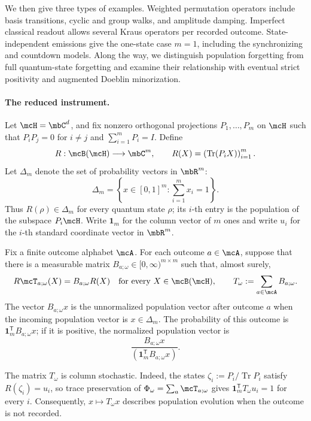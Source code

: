 \documentclass[a4paper]{article}
\numberwithin{equation}{section}   %
\theoremstyle{plain}   %
\theoremstyle{plain}   %
\theoremstyle{examplestyle}
\begin{document}
    We then give three types of examples. Weighted permutation operators include basis transitions, cyclic and group walks, and amplitude damping.
    Imperfect classical readout allows several Kraus operators per recorded outcome. 
    State-independent emissions give the one-state case $m=1$, including the synchronizing and countdown models.
    Along the way, we distinguish population forgetting from full quantum-state forgetting and examine their relationship with eventual strict positivity and augmented Doeblin minorization.

    \paragraph{The reduced instrument.}
        Let $\mcH=\mbC^d$, and fix nonzero orthogonal projections  $P_1,\ldots,P_m$ on $\mcH$ such that $P_iP_j=0$ for $i\ne j$ and $\sum_{i=1}^mP_i=I$.
        Define
        \[
         R:\mcB(\mcH)\longrightarrow\mbC^m,
         \qquad R(X)=\left(\operatorname{Tr}(P_iX)\right)_{i=1}^m.
        \]
        Let $\Delta_m$ denote the set of probability vectors in $\mbR^m$:
        \[
         \Delta_m=\left\{x\in[0,1]^m:\sum_{i=1}^m x_i=1\right\}.
        \]
        Thus $R(\rho)\in\Delta_m$ for every quantum state $\rho$; its $i$-th entry is the population of the subspace $P_i\mcH$.
        Write $\mathbf1_m$ for the column vector of $m$ ones and write $u_i$ for the $i$-th standard coordinate vector in $\mbR^m$.

        Fix a finite outcome alphabet $\mcA$.
        For each outcome $a\in\mcA$, suppose that there is a measurable matrix $B_{a;\omega}\in[0,\infty)^{m\times m}$ such that, almost surely,
        \begin{equation}
        \label{eq:unified:intertwining}
             R\mcT_{a;\omega}(X)=B_{a;\omega}R(X)
             \quad\text{for every }X\in\mcB(\mcH),
             \qquad T_\omega:=\sum_{a\in\mcA}B_{a;\omega}.
        \end{equation}
        The vector $B_{a;\omega}x$ is the unnormalized population vector after outcome $a$ when the incoming population vector is $x\in\Delta_m$.
        The probability of this outcome is $\mathbf1_m^{\mathsf T}B_{a;\omega}x$; if it is positive, the normalized population vector is 
        \[
            \dfrac{B_{a;\omega}x}{(\mathbf1_m^{\mathsf T}B_{a;\omega}x)}.
        \]

        The matrix $T_\omega$ is column stochastic. Indeed, the states $\zeta_i:=P_i/\operatorname{Tr}P_i$ satisfy $R(\zeta_i)=u_i$, so trace preservation of $\Phi_\omega=\sum_a\mcT_{a;\omega}$ gives $\mathbf1_m^{\mathsf T}T_\omega u_i=1$ for every $i$.
        Consequently, $x\mapsto T_\omega x$ describes population evolution when the outcome is not recorded.
\end{document}

